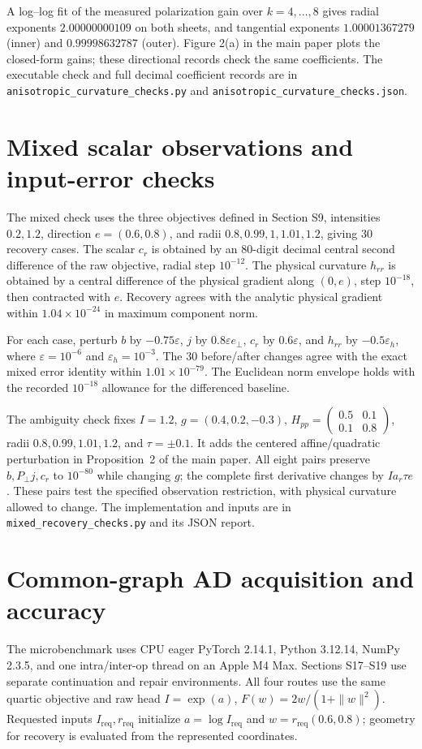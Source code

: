 A log--log fit of the measured polarization gain over $k=4,\ldots,8$ gives radial exponents $2.00000000109$ on both sheets, and tangential exponents $1.00001367279$ (inner) and $0.99998632787$ (outer). Figure 2(a) in the main paper plots the closed-form gains; these directional records check the same coefficients. The executable check and full decimal coefficient records are in \nolinkurl{anisotropic_curvature_checks.py} and \nolinkurl{anisotropic_curvature_checks.json}.


\section{Mixed scalar observations and input-error checks}
The mixed check uses the three objectives defined in Section S9, intensities $0.2,1.2$, direction $e=(0.6,0.8)$, and radii $0.8,0.99,1,1.01,1.2$, giving 30 recovery cases. The scalar $c_r$ is obtained by an 80-digit decimal central second difference of the raw objective, radial step $10^{-12}$. The physical curvature $h_{rr}$ is obtained by a central difference of the physical gradient along $(0,e)$, step $10^{-18}$, then contracted with $e$. Recovery agrees with the analytic physical gradient within $1.04\times10^{-24}$ in maximum component norm.

For each case, perturb $b$ by $-0.75\varepsilon$, $j$ by $0.8\varepsilon e_\perp$, $c_r$ by $0.6\varepsilon$, and $h_{rr}$ by $-0.5\varepsilon_h$, where $\varepsilon=10^{-6}$ and $\varepsilon_h=10^{-3}$. The 30 before/after changes agree with the exact mixed error identity within $1.01\times10^{-79}$. The Euclidean norm envelope holds with the recorded $10^{-18}$ allowance for the differenced baseline.

The ambiguity check fixes $I=1.2$, $g=(0.4,0.2,-0.3)$, $H_{pp}=\left(\begin{smallmatrix}0.5&0.1\\0.1&0.8\end{smallmatrix}\right)$, radii $0.8,0.99,1.01,1.2$, and $\tau=\pm0.1$. It adds the centered affine/quadratic perturbation in Proposition~2 of the main paper. All eight pairs preserve $b,P_\perp j,c_r$ to $10^{-80}$ while changing $g$; the complete first derivative changes by $Ia_r\tau e$. These pairs test the specified observation restriction, with physical curvature allowed to change. The implementation and inputs are in \nolinkurl{mixed_recovery_checks.py} and its JSON report.

\section{Common-graph AD acquisition and accuracy}
The microbenchmark uses CPU eager PyTorch 2.14.1, Python 3.12.14, NumPy 2.3.5, and one intra/inter-op thread on an Apple M4 Max. Sections S17--S19 use separate continuation and repair environments. All four routes use the same quartic objective and raw head $I=\exp(a)$, $F(w)=2w/(1+\|w\|^2)$. Requested inputs $I_{\mathrm{req}},r_{\mathrm{req}}$ initialize $a=\log I_{\mathrm{req}}$ and $w=r_{\mathrm{req}}(0.6,0.8)$; geometry for recovery is evaluated from the represented coordinates.

